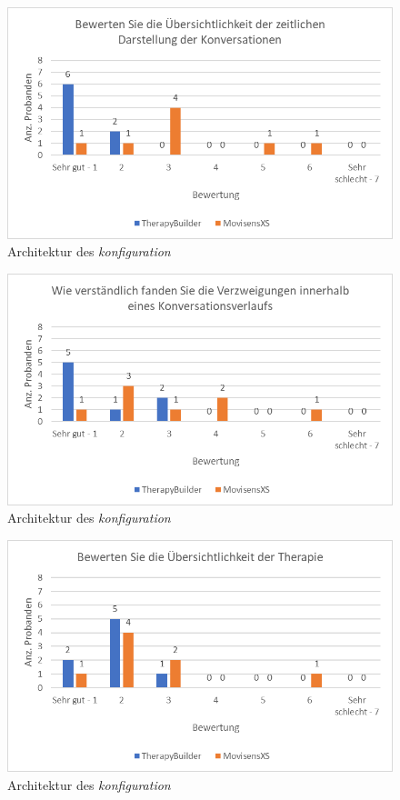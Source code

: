 \begin{figure}[h]
\centering
\includegraphics[width=1\textwidth]{pictures/diagramme/konversationzeitldarstellung}
\caption{Architektur des \emph{konfiguration}}
\label{therapyBuilder}
\end{figure}

\begin{figure}[h]
\centering
\includegraphics[width=1\textwidth]{pictures/diagramme/konvverzweig}
\caption{Architektur des \emph{konfiguration}}
\label{therapyBuilder}
\end{figure}

\begin{figure}[h]
\centering
\includegraphics[width=1\textwidth]{pictures/diagramme/therapieuebersicht}
\caption{Architektur des \emph{konfiguration}}
\label{therapyBuilder}
\end{figure}

